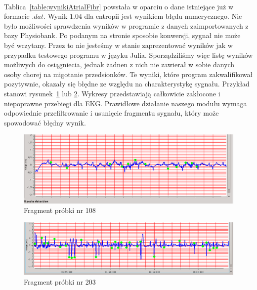 \paragraph{}
Tablica~\ref{table:wynikiAtrialFibr} powstała w oparciu o dane istniejące już w formacie $.dat$. 
Wynik $1.04$ dla entropii jest wynikiem błędu numerycznego.
Nie było możliwości sprawdzenia wyników w programie z danych zaimportowanych z bazy Physiobank.
Po podanym na stronie sposobie konwersji, sygnał nie może być wczytany.
Przez to nie jesteśmy w stanie zaprezentować wyników jak w przypadku testowego programu w języku Julia.
Sporządziliśmy więc listę wyników możliwych do osiągniecia,
jednak żadnen z nich nie zawierał w sobie danych osoby chorej na migotanie przedsionków.
Te wyniki, które program zakwalifikował pozytywnie, okazały się błędne ze względu na charakterystykę sygnału.
Przykład stanowi rysunek~\ref{fig:BadSignal108} lub \ref{fig:BadSignal203}. 
Wykresy przedstawiają całkowicie zakłocone i niepoprawne przebiegi dla EKG.
Prawidłowe działanie naszego modułu wymaga odpowiednie przefiltrowanie i usunięcie fragmentu sygnału,
który może spowodować błędny wynik.

\begin{figure}[ht]
\centering
\includegraphics[width=\textwidth]{ATRIAL_FIBR/img/BadSignal108.png}
\caption{Fragment próbki nr 108} \label{fig:BadSignal108}
\end{figure}
\begin{figure}[ht]
\centering
\includegraphics[width=\textwidth]{ATRIAL_FIBR/img/BadSignal203.png}
\caption{Fragment próbki nr 203} \label{fig:BadSignal203}
\end{figure}

